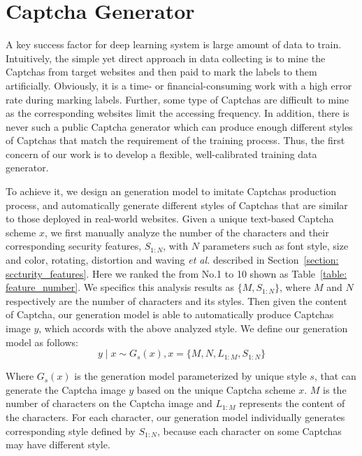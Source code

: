 \section{Captcha Generator} \label{section: Captcha_generator}
A key success factor for deep learning system is large amount of data to train.
Intuitively, the simple yet direct approach in data collecting is to mine the Captchas from target websites and then paid to mark the labels to them artificially. Obviously, it is a time- or financial-consuming work with a high error rate during marking labels. Further, some type of Captchas are difficult to mine as the corresponding websites limit the accessing frequency.
In addition, there is never such a public Captcha generator which can produce enough different styles of Captchas that match the requirement of the training process.
Thus, the first concern of our work is to develop a flexible, well-calibrated training data generator.

To achieve it, we design an generation model to imitate Captchas production process, and automatically generate different styles of Captchas that are similar to those deployed in real-world websites.
Given a unique text-based Captcha scheme $x$, we first manually analyze the number of the characters and their corresponding security features, $S_{1:N}$, with $N$ parameters such as font style, size and color, rotating, distortion and waving \emph{et al.} described in Section~\ref{section: sccturity_features}.
Here we ranked the from No.1 to 10 shown as Table~\ref{table: feature_number}.
We specifics this analysis results as $\{ M, S_{1:N} \}$, where $M$ and $N$ respectively are the number of characters and its styles.
Then given the content of Captcha, our generation model is able to automatically produce Captchas image $y$, which accords with the above analyzed style.
We define our generation model as follows:
\begin{equation}\label{equation: generator_model}
  y \mid x \sim G_s(x),    x = \{M, N, L_{1:M}, S_{1:N} \}
\end{equation}

Where $G_s(x)$ is the generation model parameterized by unique style $s$, that can generate the Captcha image $y$ based on the unique Captcha scheme $x$. $M$ is the number of characters on the Captcha image and $L_{1:M}$ represents the content of the characters. For each character, our generation model individually generates corresponding style defined by $S_{1:N}$, because each character on some Captchas may have different style.

